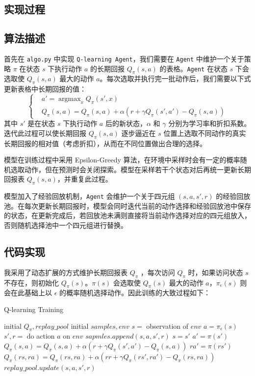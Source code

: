 \documentclass[a4paper,12pt]{article}
\begin{document}
\begin{CJK}{UTF8}{gbsn}
\section{实现过程}
\subsection{算法描述}
首先在 \texttt{algo.py} 中实现 \texttt{Q-learning Agent}，我们需要在 \texttt{Agent} 中维护一个关于策略 $\pi$ 在状态 $s$ 下执行动作 $a$ 的长期回报 $Q_\pi(s,a)$ 的表格。\texttt{Agent} 在状态 $s$ 下会选取使 $Q_\pi(s,a)$ 最大的动作 $a$。每次选取并执行完一批动作后，我们需要以下式更新表格中长期回报的值：
$$
\begin{cases}
		&a'= \mathop{\arg\max}_{x} Q_\pi(s',x)\\
		&Q_\pi(s,a)=Q_\pi(s,a)+\alpha(r+\gamma Q_\pi(s',a')-Q_\pi(s,a)) 
\end{cases}
$$
其中 $s'$ 是在状态 $s$ 下执行动作 $a$ 后的新状态，$\alpha$ 和 $\gamma$ 分别为学习率和折扣系数。迭代此过程可以使长期回报 $Q_\pi(s,a)$ 逐步逼近在 $s$ 位置上选取不同动作的真实长期回报的相对值（考虑折扣），从而在不同位置做出合理的选择。


模型在训练过程中采用 Epsilon-Greedy 算法，在环境中采样时会有一定的概率随机选取动作，但在预测时会关闭探索。模型在采样若干个状态对后再统一更新长期回报表 $Q_\pi(s,a)$，并重复此过程。


模型加入了经验回放机制，\texttt{Agent} 会维护一个关于四元组 $(s,a,s',r)$ 的经验回放池。在每次更新长期回报时，模型会同时迭代当前的动作选择和经验回放池中保存的状态，在更新完成后，若回放池未满则直接将当前动作选择对应的四元组放入，否则随机选择池中一个四元组进行替换。
\subsection{代码实现}
我采用了动态扩展的方式维护长期回报表 $Q_\pi$ ，每次访问 $Q_\pi$ 时，如果访问状态 $s$ 不存在，则初始化 $Q_\pi(s)$。$\pi(s)$ 会选取使 $Q_\pi(s)$ 最大的动作 $a$，$\pi_\epsilon(s)$ 则会在此基础上以 $\epsilon$ 的概率随机选择动作。因此训练的大致过程如下：
\begin{algorithm}[!h]
	\caption{Q-learning Training}
	\begin{algorithmic}[1]
		\STATE initial $Q_\pi,replay\_pool$
		\STATE initial $samples,env$
		\STATE $s=$ observation of $env$
			\STATE $a=\pi_\epsilon(s)$
			\STATE $s',r=$ do action $a$ on $env$
			\STATE $sapmles.append(s,a,s',r)$
			\STATE $s=s'$
			\ENDFOR
			\STATE $a'=\pi(s')$
			\STATE $Q_\pi(s,a)=Q_\pi(s,a)+\alpha(r+\gamma Q_\pi(s',a')-Q_\pi(s,a))$
					\STATE $ra'=\pi(rs')$
					\STATE $Q_\pi(rs,ra)=Q_\pi(rs,ra)+\alpha(rr+\gamma Q_\pi(rs',ra')-Q_\pi(rs,ra))$
				\ENDFOR
			\STATE $replay\_pool.update(s,a,s',r)$
			\ENDFOR
		\ENDFOR
	\end{algorithmic}
\end{algorithm}

\end{CJK}
\end{document}

